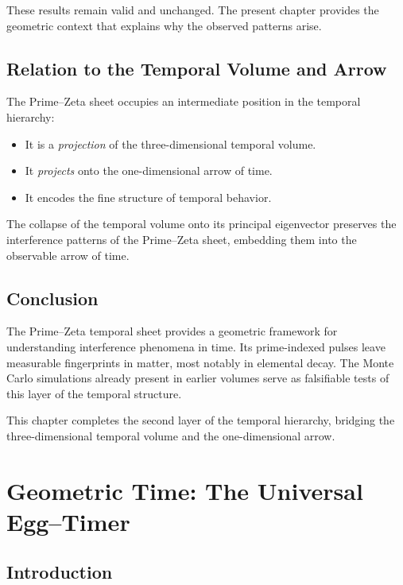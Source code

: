 \documentclass[11pt, letterpaper, openany]{book}
\begin{document}
These results remain valid and unchanged. 
The present chapter provides the geometric context that explains why the 
observed patterns arise.

\section{Relation to the Temporal Volume and Arrow}

The Prime--Zeta sheet occupies an intermediate position in the temporal 
hierarchy:

\begin{itemize}
    \item It is a \emph{projection} of the three-dimensional temporal volume.
    \item It \emph{projects} onto the one-dimensional arrow of time.
    \item It encodes the fine structure of temporal behavior.
\end{itemize}

The collapse of the temporal volume onto its principal eigenvector preserves 
the interference patterns of the Prime--Zeta sheet, embedding them into the 
observable arrow of time.

\section{Conclusion}
The Prime--Zeta temporal sheet provides a geometric framework for understanding 
interference phenomena in time. 
Its prime-indexed pulses leave measurable fingerprints in matter, most notably 
in elemental decay. 
The Monte Carlo simulations already present in earlier volumes serve as 
falsifiable tests of this layer of the temporal structure.

This chapter completes the second layer of the temporal hierarchy, bridging 
the three-dimensional temporal volume and the one-dimensional arrow.


\chapter{Geometric Time: The Universal Egg--Timer}
\label{chap:the_universal_eggtimer}


\section{Introduction}
\end{document}
